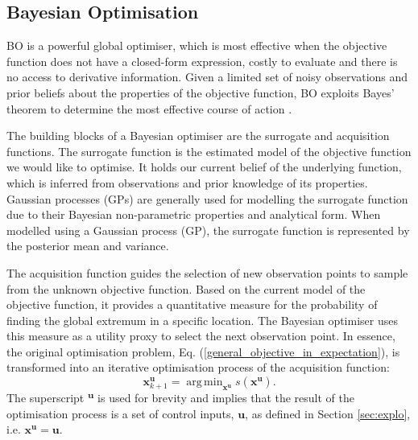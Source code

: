 \documentclass[shortAfour,sageh,times]{sagej_no_sage}
\DeclareMathOperator*{\argmin}{arg\,min}
\begin{document}
\subsection{Bayesian Optimisation} \label{subsec:CBO_BO}
BO is a powerful global optimiser, which is most effective when 
the objective function does not have a closed-form expression, costly to evaluate and there is no access to derivative information. Given a limited 
set of noisy observations and prior beliefs about the properties of the objective function, BO exploits Bayes' theorem to determine the most 
effective course of action \citep{Brochu2010}. 

The building blocks of a Bayesian optimiser are the surrogate and acquisition functions. The surrogate function 
is the estimated model of the objective function we would like to optimise. It holds our current belief of the underlying function, which is inferred from 
observations and prior knowledge of its properties. Gaussian processes (GPs) are generally used for modelling the 
surrogate function due to their Bayesian non-parametric properties and analytical form. When modelled using a 
Gaussian process (GP), the surrogate function is represented by the posterior mean and variance.

The acquisition function guides the selection of new observation points to sample from the unknown objective function. Based on the current model of the objective function, it provides a quantitative measure for the probability of finding the global extremum in a specific location. The Bayesian optimiser uses this measure as a utility proxy to select the next observation point. In essence, the original optimisation problem, Eq. (\ref{general_objective_in_expectation}), is transformed into an iterative optimisation process of the acquisition function:
\begin{equation}\label{general_acquisition_function_optimisation}
\boldsymbol{x}^{\boldsymbol{u}}_{k+1} = \argmin_{\boldsymbol{x}^{\boldsymbol{u}}}  s(\boldsymbol{x}^{\boldsymbol{u}}).
\end{equation}
The superscript \textsuperscript{$\boldsymbol{u}$} is used for brevity and implies that the result of the optimisation process is a set of control inputs, $\boldsymbol{u}$, as defined in Section \ref{sec:explo}, i.e. $\boldsymbol{x}^{\boldsymbol{u}} =\boldsymbol{u}$.
\end{document}
